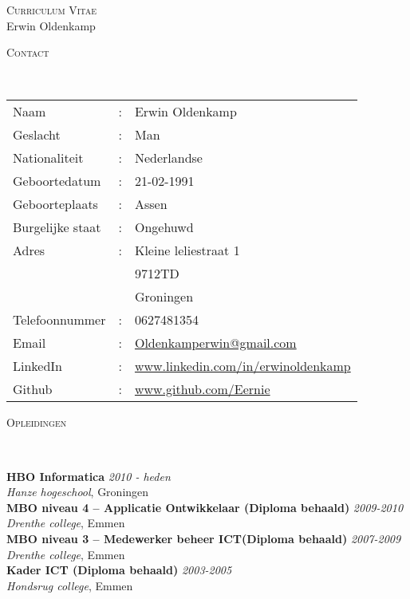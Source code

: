\documentclass[9pt]{article}
\newenvironment{changemargin}[2]{%
  \begin{list}{}{%
    \setlength{\topsep}{0pt}%
    \setlength{\leftmargin}{#1}%
    \setlength{\rightmargin}{#2}%
    \setlength{\listparindent}{\parindent}%
    \setlength{\itemindent}{\parindent}%
    \setlength{\parsep}{\parskip}%
  }%
  \item[]}{\end{list}
}
\newcommand{\lineover}{
	\begin{changemargin}{-0.05in}{-0.05in}
		\vspace*{-8pt}
		\hrulefill \\
		\vspace*{-2pt}
	\end{changemargin}
}
\newcommand{\header}[1]{
	\begin{changemargin}{-0.5in}{-0.5in}
		\scshape{#1}\\
  	\lineover
	\end{changemargin}
}
\newcommand{\PageHead}[2]{
	\begin{changemargin}{-0.5in}{-0.5in}
		\begin{center}
			{\Large \scshape {#1}}\\ \smallskip
			{\Large {#2}}
		\end{center}
	\end{changemargin}
}
\newenvironment{body} {
	\vspace*{-16pt}
	\begin{changemargin}{-0.25in}{-0.5in}
  }	
	{\end{changemargin}
}
\begin{document}
\PageHead{Curriculum Vitae}{Erwin Oldenkamp}


\header{Contact}

\begin{body}
	\vspace{14pt}
	\begin{tabular}{l l l}
		Naam&:&Erwin Oldenkamp \\
		Geslacht&:&Man  \\
		Nationaliteit&:&Nederlandse \\
		Geboortedatum&:&21-02-1991 \\
		Geboorteplaats&:&Assen \\
		Burgelijke staat&:&Ongehuwd \\
		Adres&:&Kleine leliestraat 1 \\ 
		& & 9712TD \\ 
   		& & Groningen \\ 
		Telefoonnummer & : & 0627481354 \\
		Email &:&  \href{mailto:oldenkamperwin@gmail.com}{Oldenkamperwin@gmail.com}\\
		LinkedIn & : & \href{http://www.linkedin.com/in/erwinoldenkamp}{www.linkedin.com/in/erwinoldenkamp} \\
		Github & : & \href{http://www.github.com/Eernie}{www.github.com/Eernie} \\
	\end{tabular}
\end{body}

\smallskip


\header{Opleidingen}
\begin{body}
	\vspace{14pt}
	\textbf{HBO Informatica}{} \hfill \emph{2010 - heden }{} \\
	\emph{Hanze hogeschool}, Groningen{} \\
  \medskip
	\textbf{MBO niveau 4 -- Applicatie Ontwikkelaar (Diploma behaald)} \hfill \emph{2009-2010} \\
	\emph{Drenthe college}, Emmen{}\\
  \medskip
	\textbf{MBO niveau 3 -- Medewerker beheer ICT(Diploma behaald)} \hfill \emph{2007-2009} \\
	\emph{Drenthe college}, Emmen{}\\
  \medskip
	\textbf{Kader ICT (Diploma behaald)} \hfill \emph{2003-2005} \\
	\emph{Hondsrug college}, Emmen{}\\
\end{body}
\end{document}
